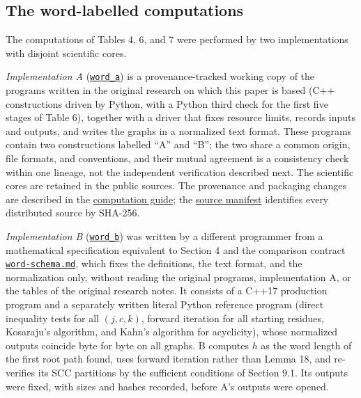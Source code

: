 \documentclass[11pt,reqno]{amsart}
\theoremstyle{definition}
\theoremstyle{remark}
\begin{document}
\subsection{The word-labelled computations}\label{sec:9.3}

The computations of Tables 4, 6, and 7 were performed by two
implementations with disjoint scientific cores.

\emph{Implementation A} (\href{supplement/COMPUTATION.md}{\nolinkurl{word_a}}) is a
provenance-tracked working copy of the programs written in the original
research on which this paper is based (C++ constructions driven by
Python, with a Python third check for the first five stages of
Table 6), together with a driver that fixes resource limits, records
inputs and outputs, and writes the graphs in a normalized text format.
These programs contain two constructions labelled ``A'' and ``B'';
the two share a common origin, file formats, and conventions, and their
mutual agreement is a consistency check within one lineage, not the
independent verification described next. The scientific cores are retained in the public sources. The provenance and
packaging changes are described in the \href{supplement/COMPUTATION.md}{computation guide}; the \href{MANIFEST.json}{source manifest}
identifies every distributed source by SHA-256.

\emph{Implementation B} (\href{supplement/COMPUTATION.md}{\nolinkurl{word_b}}) was
written by a different programmer from a mathematical
specification equivalent to Section 4 and the
comparison contract
\href{supplement/computations/word-schema.md}{\nolinkurl{word-schema.md}},
which fixes the definitions, the text format, and the normalization
only, without reading the original programs, implementation A, or the
tables of the original research notes. It consists of a C++17 production program and a
separately written literal Python reference program (direct inequality
tests for all \((j,c,k)\), forward iteration for all starting residues,
Kosaraju's algorithm, and Kahn's algorithm for acyclicity), whose
normalized outputs coincide byte for byte on all graphs. B computes
\(h\) as the word length of the first root path found, uses forward
iteration rather than Lemma 18, and re-verifies its SCC partitions by the
sufficient conditions of Section 9.1. Its outputs were fixed, with sizes
and hashes recorded, before A's outputs were opened.
\end{document}
